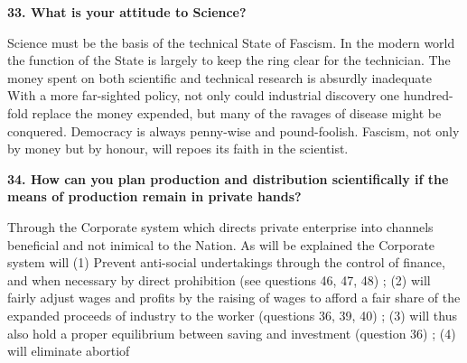 \documentclass{book}
\begin{document}
\begin{flushleft}
\textbf{33. What is your attitude to Science?}

Science must be the basis of the technical State of Fascism. In the modern world the function of
the State is largely to keep the ring clear for the technician. The money spent on both scientific
and technical research is absurdly inadequate With a more far-sighted policy, not only could
industrial discovery one hundred-fold replace the money expended, but many of the ravages of
disease might be conquered. Democracy is always penny-wise and pound-foolish. Fascism, not only by money but by honour, will repoes its faith in the scientist.
\end{flushleft}

\begin{flushright}
    \textbf{34. How can you plan production and distribution scientifically if the means of production remain in private hands?}

Through the Corporate system which directs private enterprise into channels beneficial and not
inimical to the Nation. As will be explained the Corporate system will (1) Prevent anti-social
undertakings through the control of finance, and when necessary by direct prohibition (see
questions 46, 47, 48) ; (2) will fairly adjust wages and profits by the raising of wages to afford a
fair share of the expanded proceeds of industry to the worker (questions 36, 39, 40) ; (3) will thus
also hold a proper equilibrium between saving and investment (question 36) ; (4) will eliminate abortiof
\end{flushright}
\end{document}
